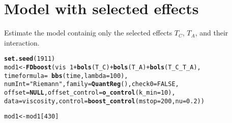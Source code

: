 \documentclass{article}\usepackage[]{graphicx}\usepackage[]{color}
\makeatletter
\newcommand{\hlnum}[1]{\textcolor[rgb]{0.686,0.059,0.569}{#1}}%
\newcommand{\hlstr}[1]{\textcolor[rgb]{0.192,0.494,0.8}{#1}}%
\newcommand{\hlopt}[1]{\textcolor[rgb]{0,0,0}{#1}}%
\newcommand{\hlstd}[1]{\textcolor[rgb]{0.345,0.345,0.345}{#1}}%
\newcommand{\hlkwa}[1]{\textcolor[rgb]{0.161,0.373,0.58}{\textbf{#1}}}%
\newcommand{\hlkwb}[1]{\textcolor[rgb]{0.69,0.353,0.396}{#1}}%
\newcommand{\hlkwc}[1]{\textcolor[rgb]{0.333,0.667,0.333}{#1}}%
\newcommand{\hlkwd}[1]{\textcolor[rgb]{0.737,0.353,0.396}{\textbf{#1}}}%
\newenvironment{kframe}{%
 \def\at@end@of@kframe{}%
 \ifinner\ifhmode%
  \def\at@end@of@kframe{\end{minipage}}%
  \begin{minipage}{\columnwidth}%
 \fi\fi%
 \def\FrameCommand##1{\hskip\@totalleftmargin \hskip-\fboxsep
 \colorbox{shadecolor}{##1}\hskip-\fboxsep
     \hskip-\linewidth \hskip-\@totalleftmargin \hskip\columnwidth}%
 \MakeFramed {\advance\hsize-\width
   \@totalleftmargin\z@ \linewidth\hsize
   \@setminipage}}%
 {\par\unskip\endMakeFramed%
 \at@end@of@kframe}
\newenvironment{knitrout}{}{} %
\makeatother
\begin{document}
% 





\newpage

\section{Model with selected effects}

Estimate the model containig only the selected effects $T_C$, $T_A$, and their interaction.
\begin{knitrout}
\color{fgcolor}\begin{kframe}
\begin{alltt}
\hlkwd{set.seed}\hlstd{(}\hlnum{1911}\hlstd{)}
\hlstd{mod1} \hlkwb{<-} \hlkwd{FDboost}\hlstd{(vis} \hlopt{~} \hlnum{1} \hlopt{+} \hlkwd{bols}\hlstd{(T_C)} \hlopt{+} \hlkwd{bols}\hlstd{(T_A)} \hlopt{+} \hlkwd{bols}\hlstd{(T_C_T_A),}
                \hlkwc{timeformula} \hlstd{=} \hlopt{~}\hlkwd{bbs}\hlstd{(time,} \hlkwc{lambda} \hlstd{=} \hlnum{100}\hlstd{),}
                \hlkwc{numInt} \hlstd{=} \hlstr{"Riemann"}\hlstd{,} \hlkwc{family} \hlstd{=} \hlkwd{QuantReg}\hlstd{(),} \hlkwc{check0} \hlstd{=} \hlnum{FALSE}\hlstd{,}
                \hlkwc{offset} \hlstd{=} \hlkwa{NULL}\hlstd{,} \hlkwc{offset_control} \hlstd{=} \hlkwd{o_control}\hlstd{(}\hlkwc{k_min} \hlstd{=} \hlnum{10}\hlstd{),}
                \hlkwc{data} \hlstd{= viscosity,} \hlkwc{control} \hlstd{=} \hlkwd{boost_control}\hlstd{(}\hlkwc{mstop} \hlstd{=} \hlnum{200}\hlstd{,} \hlkwc{nu} \hlstd{=} \hlnum{0.2}\hlstd{))}
\end{alltt}
\end{kframe}
\end{knitrout}

\begin{knitrout}
\color{fgcolor}\begin{kframe}
\begin{alltt}
\hlstd{mod1} \hlkwb{<-} \hlstd{mod1[}\hlnum{430}\hlstd{]}
\end{alltt}
\end{kframe}
\end{knitrout}
\end{document}
